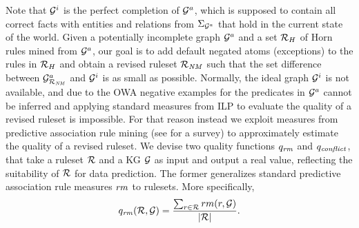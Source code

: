 Note that $\mathcal{G}^i$ is the perfect completion of $\mathcal{G}^a$, which is supposed to contain all
correct facts with entities and relations from $\Sigma_{\mathcal{G}^a}$ that hold
in the current state of the world.
Given a potentially incomplete graph $\mathcal{G}^a$ and a set $\mathcal{R}_H$ of Horn rules mined from $\mathcal{G}^a$, our goal is to add default negated atoms (exceptions) to the
rules in $\mathcal{R}_{H}$ and obtain a revised ruleset $\mathcal{R}_{\mathit{NM}}$ such that the
set difference between $\mathcal{G}^a_{\mathcal{R}_{\mathit{NM}}}$ and $\mathcal{G}^i$ is as small as possible. 
Normally, the ideal graph $\mathcal{G}^i$ is not available, and due to the OWA negative examples for the predicates in $\mathcal{G}^a$ cannot be inferred and applying standard measures from ILP to evaluate the quality of a revised ruleset is impossible.
For that reason instead we exploit measures from predictive association rule mining (see \cite{rulemeasures} for a survey) to approximately estimate the quality of a revised ruleset. We devise two quality functions $q_{\mathit{rm}}$ and $q_{\mathit{conflict}}$, that take a ruleset $\mathcal{R}$ and a KG $\mathcal{G}$ as input and output a real value, reflecting the suitability of $\mathcal{R}$ for data prediction. The former generalizes standard predictive association rule measures $\mathit{rm}$  to rulesets. More specifically, 
\begin{equation}
q_{\mathit{rm}} (\mathcal{R},\mathcal{G})=\dfrac{\sum_{r\in \mathcal{R}}rm(r,\mathcal{G})}{|\mathcal{R}|}.
\end{equation}

